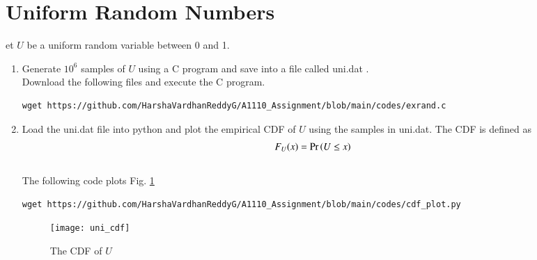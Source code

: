 \documentclass[journal,12pt,twocolumn]{IEEEtran}
\renewcommand\thesection{\arabic{section}}
\begin{document}
\section{Uniform Random Numbers}
et $U$ be a uniform random variable between 0 and 1.
\begin{enumerate}[label=\thesection.\arabic*
,ref=\thesection.\theenumi]
\item Generate $10^6$ samples of $U$ using a C program and save into a file called uni.dat .
\\
\solution Download the following files and execute the  C program.
\begin{lstlisting}
wget https://github.com/HarshaVardhanReddyG/A1110_Assignment/blob/main/codes/exrand.c
\end{lstlisting}
%
\item
Load the uni.dat file into python and plot the empirical CDF of $U$ using the samples in uni.dat. The CDF is defined as
\begin{align}
F_{U}(x) = \Pr\left(U \le x\right)
\end{align}
\\
\solution  The following code plots Fig. \ref{fig:uni_cdf}
\begin{lstlisting}
wget https://github.com/HarshaVardhanReddyG/A1110_Assignment/blob/main/codes/cdf_plot.py
\end{lstlisting}
\begin{figure}
\centering
\texttt{[image: uni\_cdf]}
\caption{The CDF of $U$}
\label{fig:uni_cdf}
\end{figure}


\end{enumerate}
\end{document}
